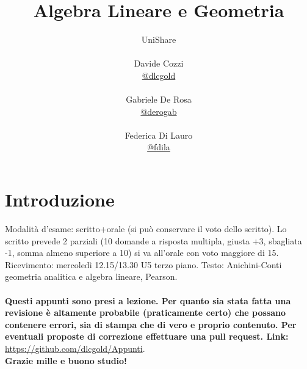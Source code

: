 \documentclass[a4paper,12pt, oneside]{book}
\title{Algebra Lineare e Geometria}
\author{UniShare\\\\Davide Cozzi\\\href{https://t.me/dlcgold}{@dlcgold}\\\\Gabriele De Rosa\\\href{https://t.me/derogab}{@derogab} \\\\Federica Di Lauro\\\href{https://t.me/f_dila}{@f\textunderscore dila}}
\date{}
\begin{document}
\maketitle


\newtheorem{teorema}{Teorema}
\newtheorem{definizione}{Definizione}
\newtheorem{esempio}{Esempio}
\newtheorem{corollario}{Corollario}
\newtheorem{lemma}{Lemma}
\newtheorem{osservazione}{Osservazione}
\newtheorem{nota}{Nota}
\newtheorem{esercizio}{Esercizio}
\tableofcontents
\renewcommand{\chaptermark}[1]{%
\markboth{\chaptername
\ \thechapter.\ #1}{}}
\renewcommand{\sectionmark}[1]{\markright{\thesection.\ #1}}
    \newcommand{\norm}[1]{ \left\lVert {#1} \right\rVert}
\chapter{Introduzione}
Modalità d'esame: scritto+orale (si può conservare il voto dello scritto). Lo scritto prevede 2 parziali (10 domande a risposta multipla, giusta +3, sbagliata -1, somma almeno superiore a 10) si va all'orale con voto maggiore di 15.
Ricevimento: mercoledì 12.15/13.30 U5 terzo piano.
Testo: Anichini-Conti geometria analitica e algebra lineare, Pearson.\\
\\
\textbf{Questi appunti sono presi a lezione. Per quanto sia stata fatta una revisione è altamente probabile (praticamente certo) che possano contenere errori, sia di stampa che di vero e proprio contenuto. Per eventuali proposte di correzione effettuare una pull request. Link: } \url{https://github.com/dlcgold/Appunti}.\\
\textbf{Grazie mille e buono studio!}
\end{document}
